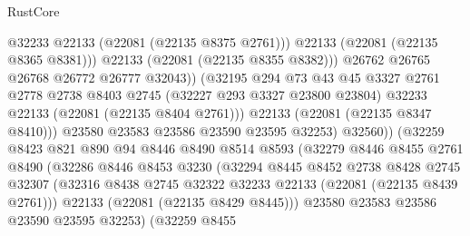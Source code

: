 \begin{lexlean}{RustCore}
\begin{coremodule}
                                    @32233
                                    @22133
                                    (@22081 (@22135 @8375 @2761)))
                                  @22133
                                  (@22081 (@22135 @8365 @8381)))
                                @22133
                                (@22081 (@22135 @8355 @8382)))
                              @26762
                              @26765
                              @26768
                              @26772
                              @26777
                              @32043))
                          (@32195
                            @294
                            @73
                            @43
                            @45
                            @3327
                            @2761
                            @2778
                            @2738
                            @8403
                            @2745
                            (@32227 @293 @3327 @23800 @23804)
                            @32233
                            @22133
                            (@22081 (@22135 @8404 @2761)))
                          @22133
                          (@22081 (@22135 @8347 @8410)))
                        @23580
                        @23583
                        @23586
                        @23590
                        @23595
                        @32253)
                      @32560))
                  (@32259
                    @8423
                    @821
                    @890
                    @94
                    @8446
                    @8490
                    @8514
                    @8593
                    (@32279
                      @8446
                      @8455
                      @2761
                      @8490
                      (@32286
                        @8446
                        @8453
                        @3230
                        (@32294
                          @8445
                          @8452
                          @2738
                          @8428
                          @2745
                          @32307
                          (@32316 @8438 @2745 @32322 @32233 @22133 (@22081 (@22135 @8439 @2761)))
                          @22133
                          (@22081 (@22135 @8429 @8445)))
                        @23580
                        @23583
                        @23586
                        @23590
                        @23595
                        @32253)
                      (@32259
                        @8455

\end{coremodule}
\end{lexlean}

